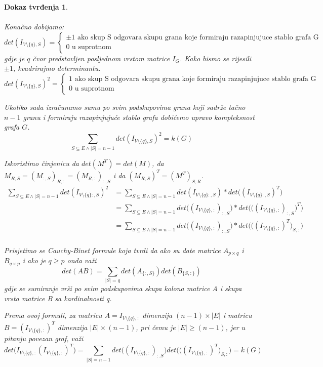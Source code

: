 \documentclass[11pt]{article}
\newtheorem*{custom_proof}{Dokaz tvrđenja}
\begin{document}
\begin{custom_proof}
		\paragraph{}
		Konačno dobijamo:
		\[
		 det(I_{V \setminus \{q\},S}) = 
		\begin{cases}
		\pm 1 \text{ ako skup S odgovara skupu grana koje formiraju razapinjujuce stablo grafa G} \\
		0 \text{ u suprotnom }
		\end{cases} 
		\]
		gdje je $q$ čvor predstavljen posljednom vrstom matrice $I_G$. 
		Kako bismo se rijesili $\pm 1$, kvadrirajmo determinantu.
		\[
		 det(I_{V \setminus \{q\},S})^2 = 
		\begin{cases}
		1 \text{ ako skup S odgovara skupu grana koje formiraju razapinjujuce stablo grafa G}\\
		0 \text{ u suprotnom}
		\end{cases} 
		\]
	
		Ukoliko sada izračunamo sumu po svim podskupovima grana koji sadrže tačno $n-1$ granu i formiraju razapinjujuće stablo grafa dobićemo upravo kompleksnost grafa $G$.
		\[
		\sum_{S \subseteq E \land |S| = n -1}   det(I_{V \setminus \{q\},S})^2 = k(G)
		\]
	
		Iskoristimo činjenicu da $det(M^T) = det(M)$, da $M_{R,S} = (M_{:,S})_{R,:} = (M_{R,:})_{:,S}$ i da $(M_{R,S})^T = (M^T)_{S,R}$.
		\[
		\begin{split}
		\sum_{S \subseteq E \land |S| = n -1}   det(I_{V \setminus \{q\}:,S})^2  & =
		\sum_{S \subseteq E \land |S| = n -1}   det(I_{V \setminus \{q\}:,S}) * det\big((I_{V \setminus \{q\}:,S})^T\big) \\
		&  = \sum_{S \subseteq E \land |S| = n -1}   det\big((I_{V \setminus \{q\},:})_{:,S}\big) * det\Big(\big((I_{V \setminus \{q\},:})_{:,S}\big)^T\Big)\\
		&  = \sum_{S \subseteq E \land |S| = n -1}   det\big((I_{V \setminus \{q\},:})_{:,S}\big) * det\Big(\big((I_{V \setminus \{q\},:})^T\big)_{S,:}\Big)\\
		\end{split}
		\]
	
		Prisjetimo se Cauchy-Binet formule koja tvrdi da ako su date matrice $A_{p \times q}$ i $B_{q \times p}$ i ako je $q \geq p$ onda važi
		\[
			det(AB) = \sum_{|S| = q} det(A_{\{:,S\}}) det(B_{\{S,:\}})
		\]
		gdje se sumiranje vrši po svim podskupovima skupa kolona matrice A i skupa vrsta matrice B sa kardinalnosti q.
		
		Prema ovoj formuli, za matricu $A = I_{V \setminus \{q\},:}$ dimenzija $(n - 1) \times |E|$ i matricu $B = (I_{V \setminus \{q\},:})^T$ dimenzija $|E| \times (n - 1)$, pri čemu je $|E| \geq (n-1)$, jer u pitanju
		povezan graf, važi
		\[
		det \big(I_{V \setminus \{q\},:} (I_{V \setminus \{q\},:})^T\big) = \sum_{|S| = n - 1} det\big((I_{V \setminus \{q\},:})_{:.S}\big) det\Big(\big((I_{V \setminus \{q\},:})^T\big)_{S,:}\Big) = k(G)
		\] 
		

\end{custom_proof}
\end{document}
